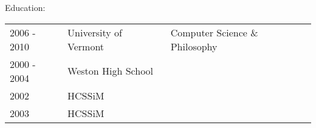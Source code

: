 \documentclass[11pt]{article}
\begin{document}



\noindent Education:

\begin{tabular}{lll}
  2006 - 2010 & University of Vermont & Computer Science \& Philosophy\\
  2000 - 2004 & Weston High School &  \\
  2002 &  HCSSiM & \\
  2003 &  HCSSiM & \\ 
\end{tabular}


\end{document}
